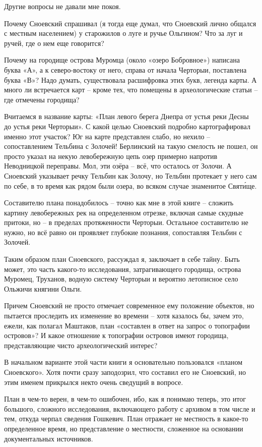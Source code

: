 Другие вопросы не давали мне покоя.

Почему Сноевский спрашивал (я тогда еще думал, что Сноевский лично общался с местным населением) у старожилов о луге и ручье Ольгином? Что за луг и ручей, где о нем еще говорится?

Почему на городище острова Муромца (около «озеро Бобровное») написана буква «А», а к северо-востоку от него, справа от начала Черторыи, поставлена буква «В»? Надо думать, существовала расшифровка этих букв, легенда карты. А много ли встречается карт – кроме тех, что помещены в археологические статьи – где отмечены городища?

Вчитаемся в название карты: «План левого берега Днепра от устья реки Десны до устья реки Черторыи». С какой целью Сноевский подробно картографировал именно этот участок? Юг на карте представлен слабо, но нехило – сопоставлением Тельбина с Золочей! Берлинский на такую смелость не пошел, он просто указал на некую левобережную цепь озер примерно напротив Неводницкой переправы. Мол, эти озёра – всё, что осталось от Золочи. А Сноевский указывает речку Тельбин как Золочу, но Тельбин протекает у него сам по себе, в то время как рядом были озера, во всяком случае знаменитое Свят\'ище.

Составителю плана понадобилось – точно как мне в этой книге – сложить картину левобережных рек на определенном отрезке, включая самые скудные притоки, но – в пределах протяженности Черторыи. Остальное составителю не нужно, но всё равно он проявляет глубокие познания, сопоставляя Тельбин с Золочей.

Таким образом план Сноевского, рассуждал я, заключает в себе тайну. Быть может, это часть какого-то исследования, затрагивающего городища, острова Муромец, Труханов, водную систему Черторыи и вероятно летописное село Ольжичи княгини Ольги. 

Причем Сноевский не просто отмечает современное ему положение объектов, но пытается проследить их изменение во времени – хотя казалось бы, зачем это, ежели, как полагал Маштаков, план «составлен в ответ на запрос о топографии островов»? И какое отношение к топографии островов имеют городища, представляющие чисто археологический интерес?

В начальном варианте этой части книги я основательно пользовался «планом Сноевского». Хотя почти сразу заподозрил, что составил его не Сноевский, но этим именем прикрылся некто очень сведущий в вопросе.

План в чем-то верен, в чем-то ошибочен, ибо, как я понимаю теперь, это итог большого, сложного исследования, включающего работу с архивом в том числе и тем, откуда черпал сведения Гошкевич. План отражает не местность в какое-то определенное время, но представление о местности, сложенное на основании документальных источников. 

